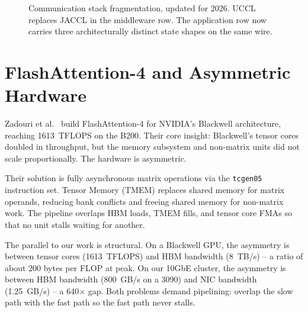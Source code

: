 \documentclass[11pt,letterpaper]{article}
\begin{document}
\begin{figure}[htbp]
{%
}
\caption{Communication stack fragmentation, updated for 2026. UCCL replaces JACCL in the middleware row. The application row now carries three architecturally distinct state shapes on the same wire.}
\label{fig:fragmentation_overview}
\end{figure}

\section{FlashAttention-4 and Asymmetric Hardware}
\label{sec:fa4}

Zadouri et al.~\cite{zadouri2026flashattention4} build FlashAttention-4 for NVIDIA's Blackwell architecture, reaching 1613~TFLOPS on the B200. Their core insight: Blackwell's tensor cores doubled in throughput, but the memory subsystem and non-matrix units did not scale proportionally. The hardware is asymmetric.

Their solution is fully asynchronous matrix operations via the \texttt{tcgen05} instruction set. Tensor Memory (TMEM) replaces shared memory for matrix operands, reducing bank conflicts and freeing shared memory for non-matrix work. The pipeline overlaps HBM loads, TMEM fills, and tensor core FMAs so that no unit stalls waiting for another.

The parallel to our work is structural. On a Blackwell GPU, the asymmetry is between tensor cores (1613~TFLOPS) and HBM bandwidth (8~TB/s) -- a ratio of about 200 bytes per FLOP at peak. On our 10GbE cluster, the asymmetry is between HBM bandwidth (800~GB/s on a 3090) and NIC bandwidth (1.25~GB/s) -- a 640$\times$ gap. Both problems demand pipelining: overlap the slow path with the fast path so the fast path never stalls.
\end{document}
